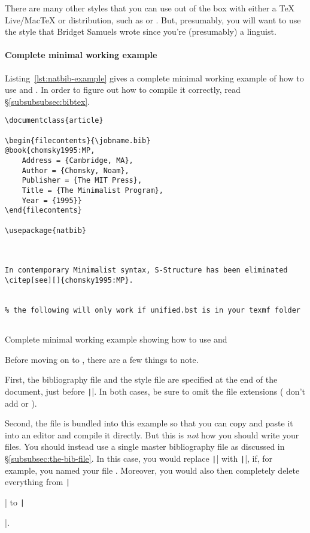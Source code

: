 There are many other styles that you can use out of the box with either a TeX Live/{Mac\TeX} or  distribution, such as  or .
But, presumably, you will want to use the  style that Bridget Samuels wrote since you're (presumably) a linguist.

\paragraph{Complete minimal working example}

Listing~\ref{lst:natbib-example} gives a complete minimal working example of how to use  and .
In order to figure out how to compile it correctly, read \S\ref{subsubsubsec:bibtex}.

\begin{listing}[htbp]
	\centering
	\begin{verbatim}
\documentclass{article}

\begin{filecontents}{\jobname.bib}
@book{chomsky1995:MP,
    Address = {Cambridge, MA},
    Author = {Chomsky, Noam},
    Publisher = {The MIT Press},
    Title = {The Minimalist Program},
    Year = {1995}}
\end{filecontents}

\usepackage{natbib}



In contemporary Minimalist syntax, S-Structure has been eliminated \citep[see][]{chomsky1995:MP}.


% the following will only work if unified.bst is in your texmf folder


	\end{verbatim}
	\caption{Complete minimal working example showing how to use  and }
	\label{lst:natbib-example}
\end{listing}

Before moving on to , there are a few things to note.

First, the bibliography file and the style file are specified at the end of the document, just before \texttt||.
In both cases, be sure to omit the file extensions (\IE{} don't add  or ).

Second, the  file is bundled into this example so that you can copy and paste it into an editor and compile it directly.
But this is \emph{not} how you should write your  files.
You should instead use a single master bibliography file as discussed in \S\ref{subsubsec:the-bib-file}.
In this case, you would replace \texttt|| with \texttt||, if, for example, you named your  file .
Moreover, you would also then completely delete everything from \texttt|\begin{filecontents}| to \texttt|\end{filecontents}|.

